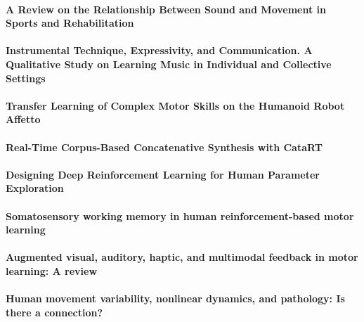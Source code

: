 \documentclass[11pt]{article}
\begin{document}
\paragraph{A Review on the Relationship Between Sound and Movement in Sports and Rehabilitation} \citep{schaffert_review_2019}


\paragraph{Instrumental Technique, Expressivity, and Communication. A Qualitative Study on Learning Music in Individual and Collective Settings} \citep{schiavio_instrumental_2019}


\paragraph{Transfer Learning of Complex Motor Skills on the Humanoid Robot Affetto} \citep{schulz_transfer_2018}


\paragraph{Real-Time Corpus-Based Concatenative Synthesis with CataRT} \citep{schwarz_real-time_2006}


\paragraph{Designing Deep Reinforcement Learning for Human Parameter Exploration} \citep{scurto_designing_2019}


\paragraph{Somatosensory working memory in human reinforcement-based motor learning} \citep{sidarta_somatosensory_2018}


\paragraph{Augmented visual, auditory, haptic, and multimodal feedback in motor learning: A review} \citep{sigrist_augmented_2013}


\paragraph{Human movement variability, nonlinear dynamics, and pathology: Is there a connection?} \citep{stergiou_human_2011}
\end{document}
